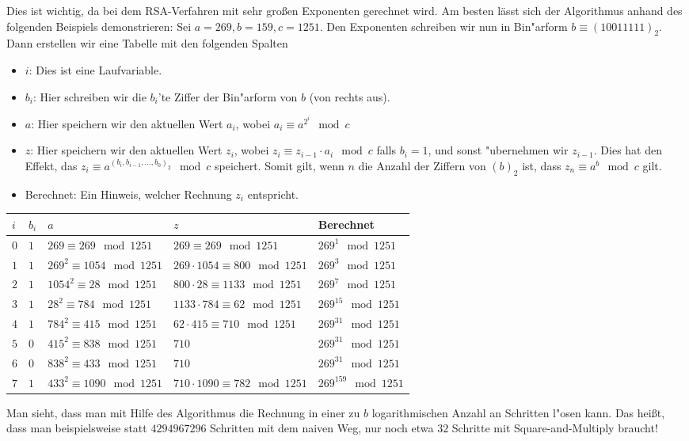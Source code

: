 \documentclass[11pt]{article}
\begin{document}
Dies ist wichtig, da bei dem RSA-Verfahren mit sehr gro{\ss}en Exponenten gerechnet wird. Am besten l\"asst sich
der Algorithmus anhand des folgenden Beispiels demonstrieren: 
Sei $a=269, b=159, c=1251$. Den Exponenten schreiben wir nun in Bin"arform $b \equiv (10011111)_2$. Dann erstellen wir
eine Tabelle mit den folgenden Spalten
\begin{itemize}
    \item $i$: Dies ist eine Laufvariable.\\
    \item $b_i$: Hier schreiben wir die $b_i$'te Ziffer der Bin"arform von $b$ (von rechts aus).\\
    \item $a$: Hier speichern wir den aktuellen Wert $a_i$, wobei $a_i \equiv a^{2^i} \mod c$\\
    \item $z$: Hier speichern wir den aktuellen Wert $z_i$, wobei $z_i \equiv z_{i-1} \cdot a_i \mod c$ falls $b_i = 1$, und sonst 
        "ubernehmen wir $z_{i-1}$. Dies hat den Effekt, das $z_i \equiv a^{(b_i, b_{i-1}, \ldots, b_0)_2} \mod c$ speichert. Somit gilt,
        wenn $n$ die Anzahl der Ziffern von $(b)_2$ ist, dass $z_n \equiv a^b \mod c$ gilt.
    \item Berechnet: Ein Hinweis, welcher Rechnung $z_i$ entspricht.
\end{itemize}
\begin{center}
    \begin{tabular}{| m{0.2cm} | m{0.2cm}| m{4cm} | m{5cm} | m{3cm} |}
    \hline
        $i$ & $b_i$ & $a$ & $z$ & Berechnet\\
    \hline
    $0$ & $1$ & $269 \equiv 269 \mod 1251$ & $269 \equiv 269 \mod 1251$ & $269^1 \mod 1251$\\
    \hline                                    
    $1$ & $1$ & $269^2 \equiv 1054 \mod 1251$ & $269 \cdot 1054 \equiv 800 \mod 1251$& $269^3 \mod 1251$\\
    \hline                                    
    $2$ & $1$ & $1054^2 \equiv 28 \mod 1251$ & $800 \cdot 28 \equiv 1133 \mod 1251$& $269^7 \mod 1251$\\
    \hline                                    
        $3$ & $1$ & $28^2 \equiv 784 \mod 1251$ & $1133 \cdot 784 \equiv 62 \mod 1251$& $269^{15} \mod 1251$\\
    \hline                                    
        $4$ & $1$ & $784^2 \equiv 415 \mod 1251$ & $62 \cdot 415 \equiv 710 \mod 1251$& $269^{31} \mod 1251$\\
    \hline                                    
        $5$ & $0$ & $415^2 \equiv 838 \mod 1251$ & $710$& $269^{31} \mod 1251$\\
    \hline                                    
        $6$ & $0$ & $838^2 \equiv 433 \mod 1251$ & $710$& $269^{31} \mod 1251$\\
    \hline                                    
        $7$ & $1$ & $433^2 \equiv 1090 \mod 1251$ & $710 \cdot 1090 \equiv 782 \mod 1251$& $269^{159} \mod 1251$\\
    \hline
\end{tabular}
\end{center}
Man sieht, dass man mit Hilfe des Algorithmus die Rechnung in einer zu $b$ logarithmischen Anzahl an Schritten l"osen kann.
Das hei{\ss}t, dass man beispielsweise statt $4294967296$ Schritten mit dem naiven Weg, nur noch etwa $32$ Schritte mit Square-and-Multiply braucht!
\end{document}
